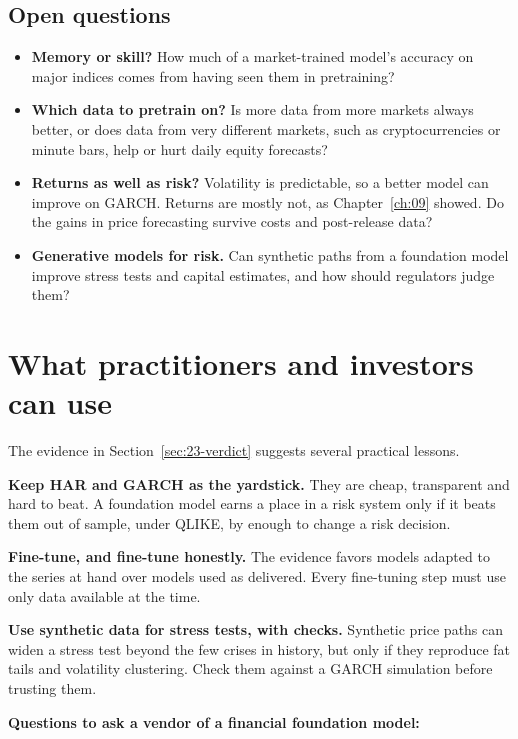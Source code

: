 \subsection{Open questions}
\label{sec:23-open}

\begin{itemize}
  \item \textbf{Memory or skill?} How much of a market-trained model's accuracy on major indices comes from having seen them in pretraining?
  \item \textbf{Which data to pretrain on?} Is more data from more markets always better, or does data from very different markets, such as cryptocurrencies or minute bars, help or hurt daily equity forecasts?
  \item \textbf{Returns as well as risk?} Volatility is predictable, so a better model can improve on GARCH. Returns are mostly not, as Chapter~\ref{ch:09} showed. Do the gains in price forecasting survive costs and post-release data?
  \item \textbf{Generative models for risk.} Can synthetic paths from a foundation model improve stress tests and capital estimates, and how should regulators judge them?
\end{itemize}

\section{What practitioners and investors can use}
\label{sec:23-investors}

The evidence in Section~\ref{sec:23-verdict} suggests several practical lessons.

\textbf{Keep HAR and GARCH as the yardstick.} They are cheap, transparent and hard to beat. A foundation model earns a place in a risk system only if it beats them out of sample, under QLIKE, by enough to change a risk decision.

\textbf{Fine-tune, and fine-tune honestly.} The evidence favors models adapted to the series at hand over models used as delivered. Every fine-tuning step must use only data available at the time.

\textbf{Use synthetic data for stress tests, with checks.} Synthetic price paths can widen a stress test beyond the few crises in history, but only if they reproduce fat tails and volatility clustering. Check them against a GARCH simulation before trusting them.

\textbf{Questions to ask a vendor of a financial foundation model:}

